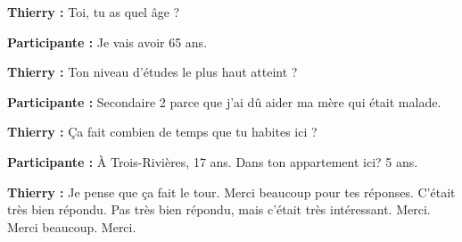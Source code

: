 \textbf{Thierry :} Toi, tu as quel âge ?

\textbf{Participante :} Je vais avoir 65 ans.

\textbf{Thierry :} Ton niveau d'études le plus haut atteint ?

\textbf{Participante :} Secondaire 2 parce que j'ai dû aider ma mère qui était malade.

\textbf{Thierry :} Ça fait combien de temps que tu habites ici ?

\textbf{Participante :} À Trois-Rivières, 17 ans. Dans ton appartement ici? 5 ans.

\textbf{Thierry :} Je pense que ça fait le tour. Merci beaucoup pour tes réponses. C'était très bien répondu. Pas très bien répondu, mais c'était très intéressant. Merci. Merci beaucoup. Merci.
